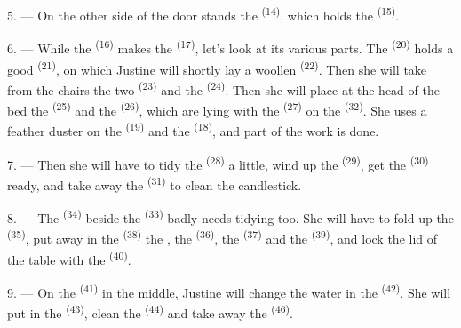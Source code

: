 5. --- On the other side of the door stands the 
\textsuperscript{(14)}, which holds the  \textsuperscript{(15)}.

6. --- While the  \textsuperscript{(16)} makes the 
\textsuperscript{(17)}, let's look at its various parts. The
 \textsuperscript{(20)} holds a good 
\textsuperscript{(21)}, on which Justine will shortly lay a woollen
 \textsuperscript{(22)}. Then she will take from the chairs the two
 \textsuperscript{(23)} and the  \textsuperscript{(24)}. Then
she will place at the head of the bed the  \textsuperscript{(25)} and the
 \textsuperscript{(26)}, which are lying with the 
\textsuperscript{(27)} on the  \textsuperscript{(32)}. She uses a feather
duster on the  \textsuperscript{(19)} and the
 \textsuperscript{(18)}, and part of the work is done.

7. --- Then she will have to tidy the  \textsuperscript{(28)} a little,
wind up the  \textsuperscript{(29)}, get the
 \textsuperscript{(30)} ready, and take away the 
\textsuperscript{(31)} to clean the candlestick.

\VUsaut{5.0mm}
\VUsaut{3.0mm}

8. --- The  \textsuperscript{(34)} beside the 
\textsuperscript{(33)} badly needs tidying too. She will have to fold up the
 \textsuperscript{(35)}, put away in the 
\textsuperscript{(38)} the , the  \textsuperscript{(36)}, the
 \textsuperscript{(37)} and the  \textsuperscript{(39)}, and
lock the lid of the table with the  \textsuperscript{(40)}.

9. --- On the  \textsuperscript{(41)} in the middle, Justine will
change the water in the  \textsuperscript{(42)}. She will put
 in the  \textsuperscript{(43)}, clean the
 \textsuperscript{(44)} and take away the 
\textsuperscript{(46)}.

